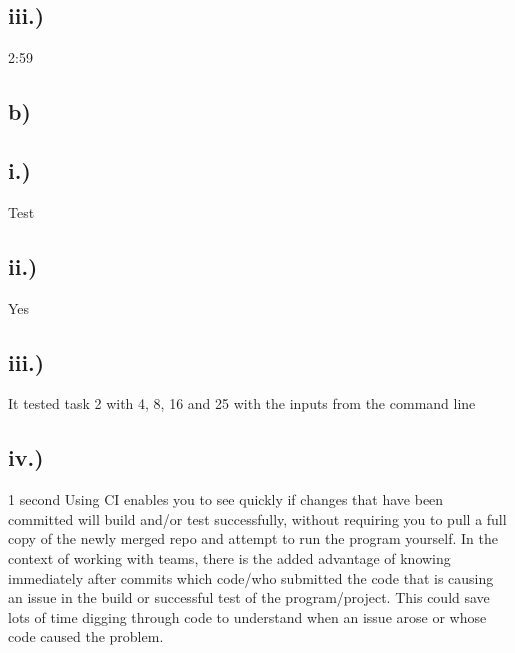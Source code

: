 \documentclass[11pt, oneside]{article}   	%
\begin{document}
\subsection*{iii.)} 2:59
\subsection*{b)}
\subsection*{i.)} Test
\subsection*{ii.)} Yes
\subsection*{iii.)} It tested task 2 with 4, 8, 16 and 25 with the inputs from the command line
\subsection*{iv.)} 1 second
\newline
\newline
Using CI enables you to see quickly if changes that have been committed will build and/or test successfully, without requiring you to pull a full copy of the newly merged repo and attempt to run the program yourself.  In the context of working with teams, there is the added advantage of knowing immediately after commits which code/who submitted the code that is causing an issue in the build or successful test of the program/project.  This could save lots of time digging through code to understand when an issue arose or whose code caused the problem.
\end{document}
